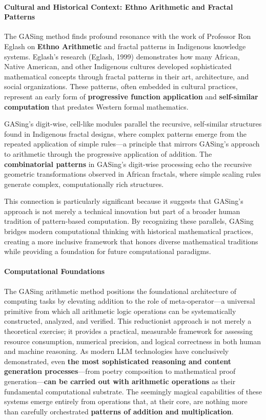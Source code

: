 \paragraph{Cultural and Historical Context: Ethno Arithmetic and Fractal Patterns}

The GASing method finds profound resonance with the work of Professor Ron Eglash on \textbf{Ethno Arithmetic} and fractal patterns in Indigenous knowledge systems. Eglash's research (Eglash, 1999) demonstrates how many African, Native American, and other Indigenous cultures developed sophisticated mathematical concepts through fractal patterns in their art, architecture, and social organizations. These patterns, often embedded in cultural practices, represent an early form of \textbf{progressive function application} and \textbf{self-similar computation} that predates Western formal mathematics.

GASing's digit-wise, cell-like modules parallel the recursive, self-similar structures found in Indigenous fractal designs, where complex patterns emerge from the repeated application of simple rules—a principle that mirrors GASing's approach to arithmetic through the progressive application of addition. The \textbf{combinatorial patterns} in GASing's digit-wise processing echo the recursive geometric transformations observed in African fractals, where simple scaling rules generate complex, computationally rich structures.

This connection is particularly significant because it suggests that GASing's approach is not merely a technical innovation but part of a broader human tradition of pattern-based computation. By recognizing these parallels, GASing bridges modern computational thinking with historical mathematical practices, creating a more inclusive framework that honors diverse mathematical traditions while providing a foundation for future computational paradigms.
\paragraph{Computational Foundations}

The GASing arithmetic method positions the foundational architecture of computing tasks by elevating addition to the role of meta-operator—a universal primitive from which all arithmetic logic operations can be systematically constructed, analyzed, and verified. This reductionist approach is not merely a theoretical exercise; it provides a practical, measurable framework for assessing resource consumption, numerical precision, and logical correctness in both human and machine reasoning. As modern LLM technologies have conclusively demonstrated, even \textbf{the most sophisticated reasoning and content generation processes}—from poetry composition to mathematical proof generation—\textbf{can be carried out with arithmetic operations} as their fundamental computational substrate. The seemingly magical capabilities of these systems emerge entirely from operations that, at their core, are nothing more than carefully orchestrated \textbf{patterns of addition and multiplication}.

